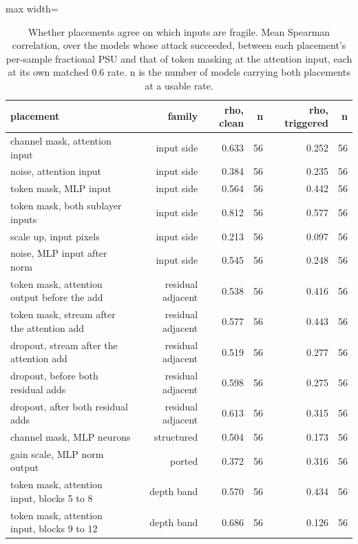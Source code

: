 \begin{table}[htbp]
\centering
\small
\caption{Whether placements agree on which inputs are fragile. Mean Spearman correlation, over the models whose attack succeeded, between each placement's per-sample fractional PSU and that of token masking at the attention input, each at its own matched 0.6 rate. n is the number of models carrying both placements at a usable rate.}
\label{tab:mech-operator-agreement}
\begin{adjustbox}{max width=\linewidth}
\begin{tabular}{lrrrrr}
\toprule
placement & family & rho, clean & n & rho, triggered & n \\
\midrule
channel mask, attention input & input side & 0.633 & 56 & 0.252 & 56 \\
noise, attention input & input side & 0.384 & 56 & 0.235 & 56 \\
token mask, MLP input & input side & 0.564 & 56 & 0.442 & 56 \\
token mask, both sublayer inputs & input side & 0.812 & 56 & 0.577 & 56 \\
scale up, input pixels & input side & 0.213 & 56 & 0.097 & 56 \\
noise, MLP input after norm & input side & 0.545 & 56 & 0.248 & 56 \\
token mask, attention output before the add & residual adjacent & 0.538 & 56 & 0.416 & 56 \\
token mask, stream after the attention add & residual adjacent & 0.577 & 56 & 0.443 & 56 \\
dropout, stream after the attention add & residual adjacent & 0.519 & 56 & 0.277 & 56 \\
dropout, before both residual adds & residual adjacent & 0.598 & 56 & 0.275 & 56 \\
dropout, after both residual adds & residual adjacent & 0.613 & 56 & 0.315 & 56 \\
channel mask, MLP neurons & structured & 0.504 & 56 & 0.173 & 56 \\
gain scale, MLP norm output & ported & 0.372 & 56 & 0.316 & 56 \\
token mask, attention input, blocks 5 to 8 & depth band & 0.570 & 56 & 0.434 & 56 \\
token mask, attention input, blocks 9 to 12 & depth band & 0.686 & 56 & 0.126 & 56 \\

\end{tabular}
\end{adjustbox}
\end{table}
